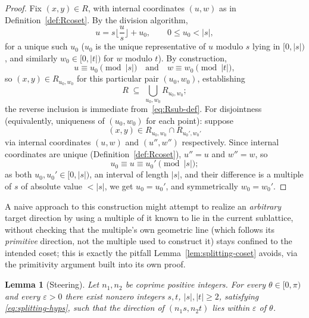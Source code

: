 \documentclass[a4paper,11pt,oneside,reqno]{amsart}
\theoremstyle{definition}
\theoremstyle{remark}
\theoremstyle{plain}
\newtheorem{lemma}[definition]{Lemma}
\begin{document}
\begin{proof}
  Fix \((x,y)\in R\), with internal coordinates \((u,w)\) as in Definition~\ref{def:Rcoset}. By the
  division algorithm,
  \[
    u=s\Big\lfloor\frac us\Big\rfloor+u_0, \qquad 0\le u_0<|s|,
  \]
  for a unique such \(u_0\) (\(u_0\) is the unique representative of \(u\) modulo \(s\) lying in
  \([0,|s|)\), and similarly \(w_0\in[0,|t|)\) for \(w\) modulo \(t\)). By construction,
  \[
    u\equiv u_0\!\!\pmod{|s|} \quad\text{and}\quad w\equiv w_0\!\!\pmod{|t|},
  \]
  so \((x,y)\in R_{u_0,w_0}\) for this particular pair
  \((u_0,w_0)\), establishing
  \[
    R\;\subseteq\;\bigcup_{u_0,w_0}R_{u_0,w_0};
  \]
  the reverse inclusion is immediate from~\eqref{eq:Rsub-def}. For disjointness (equivalently,
  uniqueness of \((u_0,w_0)\) for each point): suppose
  \[
    (x,y)\in R_{u_0,w_0}\cap R_{u_0',w_0'}
  \]
  via internal coordinates \((u,w)\) and \((u'',w'')\) respectively. Since internal coordinates are unique
  (Definition~\ref{def:Rcoset}), \(u''=u\) and \(w''=w\), so
  \[
    u_0\equiv u\equiv u_0'\!\!\pmod{|s|};
  \]
  as both
  \(u_0,u_0'\in[0,|s|)\), an interval of length \(|s|\), and their difference is a multiple of \(s\) of
  absolute value \(<|s|\), we get \(u_0=u_0'\), and symmetrically \(w_0=w_0'\).
\end{proof}

A naive approach to this construction might attempt to realize an \emph{arbitrary} target
direction by using a multiple of it known to lie in the current sublattice, without checking that
the multiple's own geometric line (which follows its \emph{primitive} direction, not the multiple
used to construct it) stays confined to the intended coset; this is exactly the pitfall
Lemma~\ref{lem:splitting-coset} avoids, via the primitivity argument built into its own proof.

\begin{lemma}[Steering]
  \label{lem:steering}
  Let \(n_1,n_2\) be coprime positive integers. For every \(\theta\in[0,\pi)\) and every
  \(\varepsilon>0\) there exist nonzero integers \(s,t\), \(|s|,|t|\ge2\), satisfying
  \eqref{eq:splitting-hyps}, such that the direction of \((n_1s,n_2t)\) lies within \(\varepsilon\) of
  \(\theta\).
\end{lemma}
\end{document}
